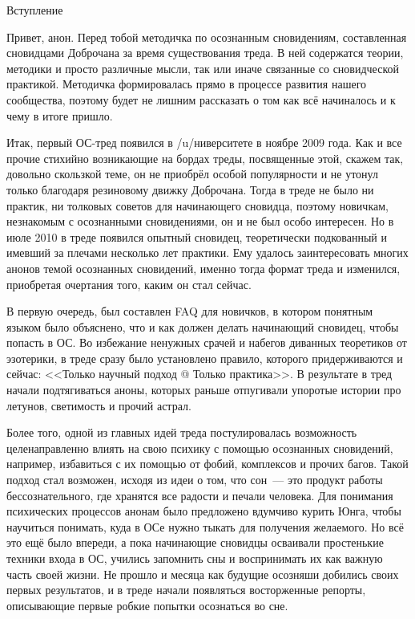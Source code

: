 \documentclass[a5paper,12pt,twoside]{memoir}
\begin{document}


\cleartorecto



\newpage
\thispagestyle{empty}

{\large\textsf{Вступление}}

\bigskip
\setcounter{page}{3}
Привет, анон. Перед тобой методичка по осознанным сновидениям, составленная сновидцами Доброчана за время существования треда. В ней содержатся теории, методики и просто различные мысли, так или иначе связанные со сновидческой практикой. Методичка формировалась прямо в процессе развития нашего сообщества, поэтому будет не лишним рассказать о том как всё начиналось и к чему в итоге пришло.

Итак, первый ОС-тред появился в /u/ниверситете в ноябре 2009 года. Как и все прочие стихийно возникающие на бордах треды, посвященные этой, скажем так, довольно скользкой теме, он не приобрёл особой популярности и не утонул только благодаря резиновому движку Доброчана. Тогда в треде не было ни практик, ни толковых советов для начинающего сновидца, поэтому новичкам, незнакомым с осознанными сновидениями, он и не был особо интересен. Но в июле 2010 в треде появился опытный сновидец,  теоретически подкованный и имевший за плечами несколько лет практики.  Ему удалось заинтересовать многих анонов темой осознанных сновидений, именно тогда формат треда и изменился, приобретая очертания того, каким он стал сейчас.

В первую очередь, был составлен FAQ для новичков, в котором понятным языком было объяснено, что и как должен делать начинающий сновидец, чтобы попасть в ОС. Во избежание ненужных срачей и набегов диванных теоретиков от эзотерики, в треде сразу было установлено правило, которого придерживаются и сейчас: <<Только научный подход @ Только практика>>. В результате в тред начали подтягиваться аноны, которых раньше отпугивали упоротые истории про летунов, светимость и прочий астрал. 

\thispagestyle{empty}

Более того, одной из главных идей треда постулировалась возможность целенаправленно влиять на свою психику с помощью осознанных сновидений, например, избавиться с их помощью от фобий, комплексов и прочих багов. Такой подход стал возможен, исходя из идеи о том, что сон~--- это продукт работы бессознательного, где хранятся все радости и печали человека. Для понимания психических процессов анонам было предложено вдумчиво курить Юнга, чтобы научиться понимать, куда в ОСе нужно тыкать для получения желаемого. Но всё это ещё было впереди, а пока начинающие сновидцы осваивали простенькие техники входа в ОС, учились запомнить сны и воспринимать их как важную часть своей жизни. Не прошло и месяца как будущие осозняши добились своих первых результатов,  и в треде начали появляться восторженные репорты, описывающие первые робкие попытки осознаться во сне.
\end{document}
